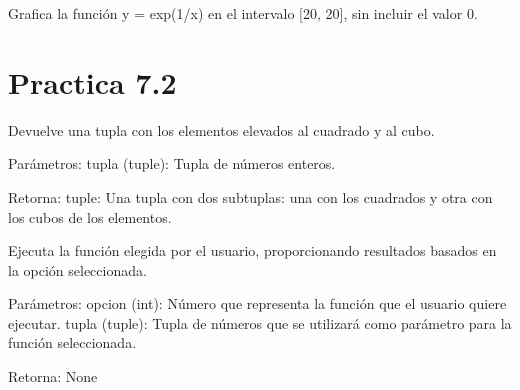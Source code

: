 \documentclass[letterpaper,10pt,spanish]{sphinxmanual}
\begin{document}

\begin{fulllineitems}
\label{\detokenize{pr7:pr7.1.grafico_9}}
\pysigstartsignatures
{}
\pysigstopsignatures
\sphinxAtStartPar
Grafica la función y = exp(1/x) en el intervalo {[}\sphinxhyphen{}20, 20{]}, sin incluir el valor 0.

\end{fulllineitems}



\section{Practica 7.2}
\label{\detokenize{pr7:module-pr7.2}}\label{\detokenize{pr7:practica-7-2}}

\begin{fulllineitems}
\label{\detokenize{pr7:pr7.2.cuadrados_y_cubos}}
\pysigstartsignatures
{}
\pysigstopsignatures
\sphinxAtStartPar
Devuelve una tupla con los elementos elevados al cuadrado y al cubo.

\sphinxAtStartPar
Parámetros:
tupla (tuple): Tupla de números enteros.

\sphinxAtStartPar
Retorna:
tuple: Una tupla con dos sub\sphinxhyphen{}tuplas: una con los cuadrados y otra con los cubos de los elementos.

\end{fulllineitems}


\begin{fulllineitems}
\label{\detokenize{pr7:pr7.2.ejecutar_funcion_elegida}}
\pysigstartsignatures
{}
\pysigstopsignatures
\sphinxAtStartPar
Ejecuta la función elegida por el usuario, proporcionando resultados basados en la opción seleccionada.

\sphinxAtStartPar
Parámetros:
opcion (int): Número que representa la función que el usuario quiere ejecutar.
tupla (tuple): Tupla de números que se utilizará como parámetro para la función seleccionada.

\sphinxAtStartPar
Retorna:
None

\end{fulllineitems}
\end{document}
